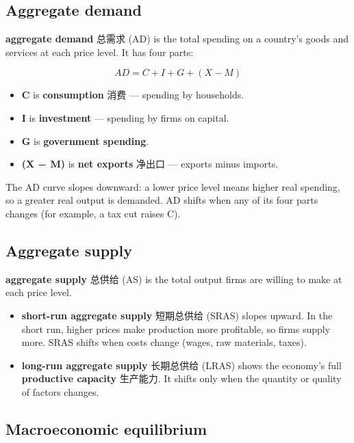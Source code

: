\documentclass[11pt]{article}
\begin{document}
\subsection*{Aggregate demand}

\textbf{aggregate demand} 总需求 (AD) is the total spending on a country's goods and services at each price level. It has four parts:

\[
AD = C + I + G + (X - M)
\]

\begin{itemize}
\item \textbf{C} is \textbf{consumption} 消费 — spending by households.

\item \textbf{I} is \textbf{investment} — spending by firms on capital.

\item \textbf{G} is \textbf{government spending}.

\item \textbf{(X − M)} is \textbf{net exports} 净出口 — exports minus imports.

\end{itemize}

The AD curve slopes downward: a lower price level means higher real spending, so a greater real output is demanded. AD shifts when any of its four parts changes (for example, a tax cut raises C).

\subsection*{Aggregate supply}

\textbf{aggregate supply} 总供给 (AS) is the total output firms are willing to make at each price level.

\begin{itemize}
\item \textbf{short-run aggregate supply} 短期总供给 (SRAS) slopes upward. In the short run, higher prices make production more profitable, so firms supply more. SRAS shifts when costs change (wages, raw materials, taxes).

\item \textbf{long-run aggregate supply} 长期总供给 (LRAS) shows the economy's full \textbf{productive capacity} 生产能力. It shifts only when the quantity or quality of factors changes.

\end{itemize}

\subsection*{Macroeconomic equilibrium}
\end{document}
